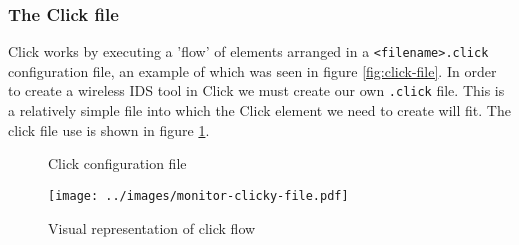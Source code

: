 	\subsubsection{The Click file}
	    Click works by executing a 'flow' of elements arranged in a \texttt{<filename>.click} configuration file, an example of which was seen in figure \ref{fig:click-file}. In order to create a wireless IDS tool in Click we must create our own \texttt{.click} file. This is a relatively simple file into which the Click element we need to create will fit. The click file use is shown in figure \ref{fig:monitor-click-file}. 

	    \begin{figure}[!ht]
	      \centering
	      
	      \caption{Click configuration file}
	      \label{fig:monitor-click-file}
	    \end{figure}

	    \begin{figure}[!ht]
	    \centering
	    \texttt{[image: ../images/monitor-clicky-file.pdf]}
	    \caption{Visual representation of click flow}
	    \label{fig:monitor-clicky-file}
	    \end{figure}

